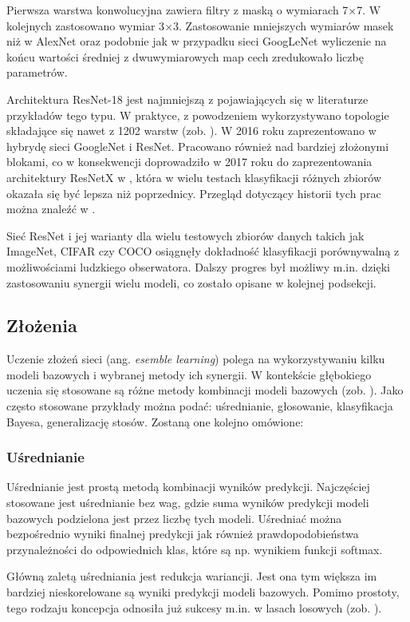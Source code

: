 Pierwsza warstwa konwolucyjna zawiera filtry z maską o wymiarach 7$\times$7. W kolejnych zastosowano wymiar 3$\times$3. Zastosowanie mniejszych wymiarów masek niż w AlexNet oraz podobnie jak w przypadku sieci GoogLeNet wyliczenie na końcu wartości średniej z dwuwymiarowych map cech zredukowało liczbę parametrów.

Architektura ResNet-18 jest najmniejszą z pojawiających się w literaturze przykładów tego typu. W praktyce, z powodzeniem wykorzystywano topologie składające się nawet z 1202 warstw (zob. \cite{ResNet}). W 2016 roku zaprezentowano w \cite{InceptionResNet} hybrydę sieci GoogleNet i ResNet. Pracowano również nad bardziej złożonymi blokami, co w konsekwencji doprowadziło w 2017 roku do zaprezentowania architektury ResNetX w \cite{ResNetX}, która w wielu testach klasyfikacji różnych zbiorów okazała się być lepsza niż poprzednicy. Przegląd dotyczący historii tych prac można znaleźć w \cite{ResNetXoverview}.

Sieć ResNet i jej warianty dla wielu testowych zbiorów danych takich jak ImageNet, CIFAR czy COCO \cite{COCO} osiągnęły dokładność klasyfikacji porównywalną z możliwościami ludzkiego obserwatora. Dalszy progres był możliwy m.in. dzięki zastosowaniu synergii wielu modeli, co zostało opisane w kolejnej podsekcji.

\subsection{Złożenia}
Uczenie złożeń sieci (ang. \textit{esemble learning}) polega na wykorzystywaniu kilku modeli bazowych i wybranej metody ich synergii. W kontekście głębokiego uczenia się stosowane są różne metody kombinacji modeli bazowych (zob. \cite{Ensemble}). Jako często stosowane przykłady można podać: uśrednianie, głosowanie, klasyfikacja Bayesa, generalizację stosów. Zostaną one kolejno omówione:

\subsubsection{Uśrednianie}
Uśrednianie jest prostą metodą kombinacji wyników predykcji. Najczęściej stosowane jest uśrednianie bez wag, gdzie suma wyników predykcji modeli bazowych podzielona jest przez liczbę tych modeli. Uśredniać można bezpośrednio wyniki finalnej predykcji jak również prawdopodobieństwa przynależności do odpowiednich klas, które są np. wynikiem funkcji softmax. 

Główną zaletą uśredniania jest redukcja wariancji. Jest ona tym większa im bardziej nieskorelowane są wyniki predykcji modeli bazowych. Pomimo prostoty, tego rodzaju koncepcja odnosiła już sukcesy m.in. w lasach losowych (zob. \cite{Breiman2001}).

